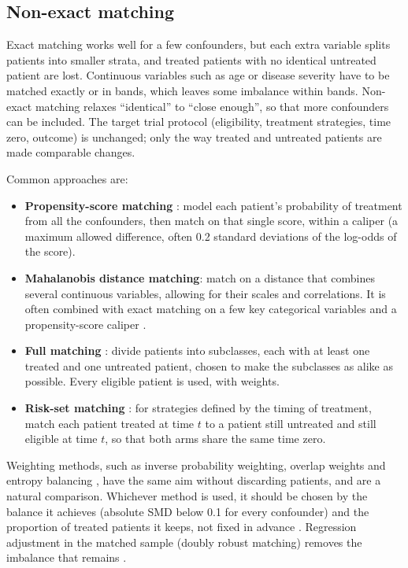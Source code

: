 \subsection{Non-exact matching}\label{sec:tte_nonexact}

Exact matching works well for a few confounders, but each extra variable splits patients into smaller strata, and treated patients with no identical untreated patient are lost. Continuous variables such as age or disease severity have to be matched exactly or in bands, which leaves some imbalance within bands. Non-exact matching relaxes ``identical'' to ``close enough'', so that more confounders can be included. The target trial protocol (eligibility, treatment strategies, time zero, outcome) is unchanged; only the way treated and untreated patients are made comparable changes.

Common approaches are:
\begin{itemize}
\item \textbf{Propensity-score matching} \cite{rosenbaum1983,austin2011}: model each patient's probability of treatment from all the confounders, then match on that single score, within a caliper (a maximum allowed difference, often 0.2 standard deviations of the log-odds of the score).
\item \textbf{Mahalanobis distance matching}: match on a distance that combines several continuous variables, allowing for their scales and correlations. It is often combined with exact matching on a few key categorical variables and a propensity-score caliper \cite{stuart2010}.
\item \textbf{Full matching} \cite{hansen2006}: divide patients into subclasses, each with at least one treated and one untreated patient, chosen to make the subclasses as alike as possible. Every eligible patient is used, with weights.
\item \textbf{Risk-set matching} \cite{li2001riskset}: for strategies defined by the timing of treatment, match each patient treated at time $t$ to a patient still untreated and still eligible at time $t$, so that both arms share the same time zero.
\end{itemize}

Weighting methods, such as inverse probability weighting, overlap weights \cite{li2018overlap} and entropy balancing \cite{hainmueller2012}, have the same aim without discarding patients, and are a natural comparison. Whichever method is used, it should be chosen by the balance it achieves (absolute SMD below 0.1 for every confounder) and the proportion of treated patients it keeps, not fixed in advance \cite{stuart2010,austin2009}. Regression adjustment in the matched sample (doubly robust matching) removes the imbalance that remains \cite{abadie2006}.

